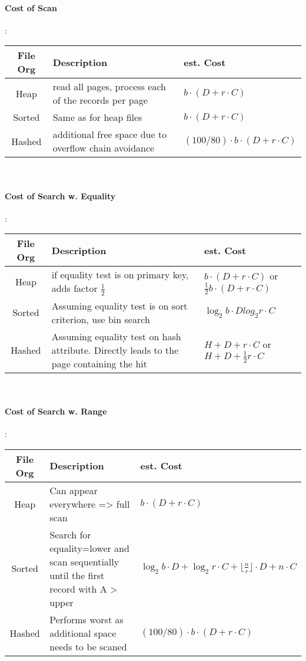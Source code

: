 \paragraph{Cost of Scan} :
\newline
\begin{tabular}{|c|p{3cm}|p{5cm}|} \hline
     File Org & Description & est. Cost \\ \hline
     Heap & read all pages, process each of the records per page & $b \cdot (D + r \cdot C)$ \\ \hline
     Sorted & Same as for heap files & $b \cdot (D + r \cdot C)$ \\ \hline
     Hashed & additional free space due to overflow chain avoidance & $ (100/80) \cdot b \cdot (D + r \cdot C)$ \\ \hline
\end{tabular} \\


\paragraph{Cost of Search w. Equality}: \\ 
\begin{tabular}{|c|p{3cm}|p{5cm}|} \hline
     File Org & Description & est. Cost \\ \hline
     Heap & if equality test is on primary key, adds factor $\frac{1}{2}$ & $b \cdot (D + r \cdot C)$ or  $ \frac{1}{2}b \cdot (D + r \cdot C)$ \\ \hline
     Sorted & Assuming equality test is on sort criterion, use bin search & $\log_2 b \cdot D  log_2 r \cdot C$ \\ \hline
     Hashed & Assuming equality test on hash attribute. Directly leads to the page containing the hit & $ H + D + r \cdot C$ or  $ H + D + \frac{1}{2} r \cdot C$ \\ \hline
\end{tabular} \\

\paragraph{Cost of Search w. Range}: \\ 
\begin{tabular}{|c|p{3cm}|p{5cm}|} \hline
     File Org & Description & est. Cost \\ \hline
     Heap & Can appear everywhere => full scan & $b \cdot (D + r \cdot C)$ \\ \hline
     Sorted & Search for equality=lower and scan sequentially until the first record with A > upper & $ \log_2 b \cdot D + \log_2 r \cdot C + \lfloor \frac{n}{r} \rfloor \cdot D + n \cdot C$ \\ \hline
     Hashed & Performs worst as additional space needs to be scaned  & $ (100/80) \cdot b \cdot (D + r \cdot C)$ \\ \hline
\end{tabular} \\

